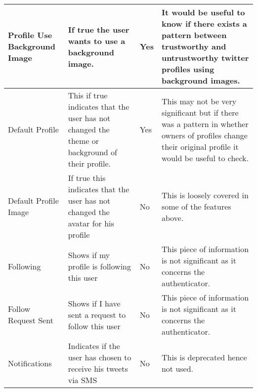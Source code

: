 \begin{landscape}
\begin{longtable}{|C{1.00in}|C{2.50in}|C{.60in}|C{5.00in}|}
\hline    
Profile Use Background Image       & If true the user wants to use a background image.                                                                              & Yes         & It would be useful to know if there exists a pattern between trustworthy and untrustworthy twitter profiles using background images.                                                             \\
\hline    
Default Profile                    & This if true indicates that the user has not changed the theme or background of their profile.                                 & Yes         & This may not be very significant but if there was a pattern in whether owners of profiles change their original profile it would be useful to check.                                             \\
\hline    
Default Profile Image              & If true this indicates that the user has not changed the avatar for his profile                                                & No          & This is loosely covered in some of the features above.                                                                                                                                           \\
\hline    
Following                          & Shows if my profile is following this user                                                                                     & No          & This piece of information is not significant as it concerns the authenticator.                                                                                                                   \\
\hline    
Follow Request Sent                & Shows if I have sent a request to follow this user                                                                             & No          & This piece of information is not significant as it concerns the authenticator.                                                                                                                   \\
\hline    
Notifications                      & Indicates if the user has chosen to receive his tweets via SMS                                                                 & No          & This is deprecated hence not used.   \\                                                                                                                                                          
\hline    
\bottomrule[1.25pt]
\end{longtable}
\label{tab:LPer}
\end{landscape}

